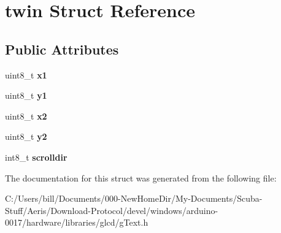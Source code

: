 \hypertarget{structtwin}{
\section{twin Struct Reference}
\label{structtwin}
}
\subsection*{Public Attributes}
\begin{DoxyCompactItemize}
\item 
\hypertarget{structtwin_a2c5bd286149061f275128faf6e5ad4e4}{
uint8\_\-t {\bfseries x1}}
\label{structtwin_a2c5bd286149061f275128faf6e5ad4e4}

\item 
\hypertarget{structtwin_a67f56f81b553b02ff7efc58dfa4d2101}{
uint8\_\-t {\bfseries y1}}
\label{structtwin_a67f56f81b553b02ff7efc58dfa4d2101}

\item 
\hypertarget{structtwin_a316bbe5f6727d59adf4de164e03327e0}{
uint8\_\-t {\bfseries x2}}
\label{structtwin_a316bbe5f6727d59adf4de164e03327e0}

\item 
\hypertarget{structtwin_a5bef7f47ce163253d03b81a86f2e52b5}{
uint8\_\-t {\bfseries y2}}
\label{structtwin_a5bef7f47ce163253d03b81a86f2e52b5}

\item 
\hypertarget{structtwin_a0b31e5eb6d86469aff57e4ed3fb16b4a}{
int8\_\-t {\bfseries scrolldir}}
\label{structtwin_a0b31e5eb6d86469aff57e4ed3fb16b4a}

\end{DoxyCompactItemize}


The documentation for this struct was generated from the following file:\begin{DoxyCompactItemize}
\item 
C:/Users/bill/Documents/000-\/NewHomeDir/My-\/Documents/Scuba-\/Stuff/Aeris/Download-\/Protocol/devel/windows/arduino-\/0017/hardware/libraries/glcd/gText.h\end{DoxyCompactItemize}
